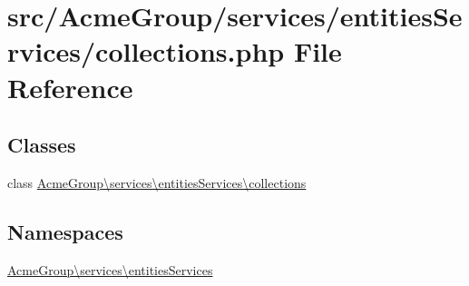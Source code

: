 \hypertarget{collections_8php}{\section{src/\+Acme\+Group/services/entities\+Services/collections.php File Reference}
\label{collections_8php}
}
\subsection*{Classes}
\begin{DoxyCompactItemize}
\item 
class \hyperlink{class_acme_group_1_1services_1_1entities_services_1_1collections}{Acme\+Group\textbackslash{}services\textbackslash{}entities\+Services\textbackslash{}collections}
\end{DoxyCompactItemize}
\subsection*{Namespaces}
\begin{DoxyCompactItemize}
\item 
 \hyperlink{namespace_acme_group_1_1services_1_1entities_services}{Acme\+Group\textbackslash{}services\textbackslash{}entities\+Services}
\end{DoxyCompactItemize}
